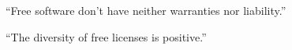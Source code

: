 \begin{frame}

\begin{center}
\huge{``Free software don't have neither warranties nor liability.''}
\end{center}

\end{frame}



\begin{frame}

\begin{center}
\huge{``The diversity of free licenses is positive.''}
\end{center}

\end{frame}




